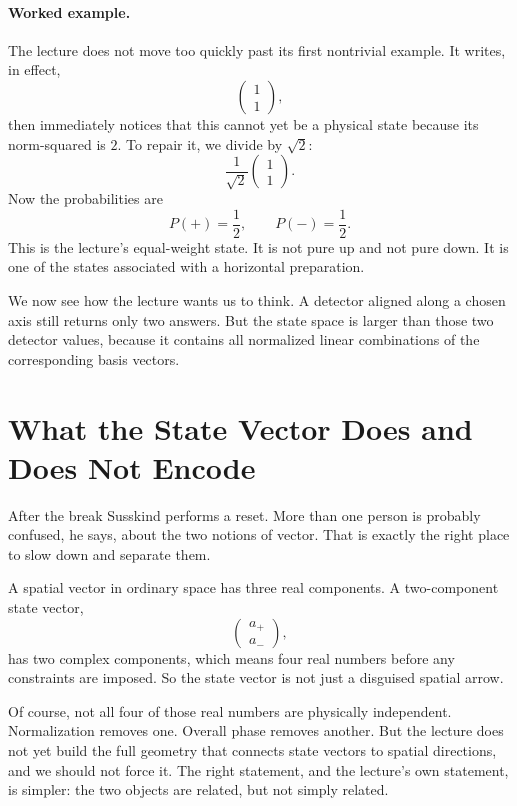 \paragraph{Worked example.}
The lecture does not move too quickly past its first nontrivial example. It writes, in effect,
\[
\begin{pmatrix}1\\1\end{pmatrix},
\]
then immediately notices that this cannot yet be a physical state because its norm-squared is \(2\). To repair it, we divide by \(\sqrt{2}\):
\begin{equation}
\frac{1}{\sqrt{2}}\begin{pmatrix}1\\1\end{pmatrix}.
\end{equation}
Now the probabilities are
\[
P(+)=\frac{1}{2},
\qquad
P(-)=\frac{1}{2}.
\]
This is the lecture's equal-weight state. It is not pure up and not pure down. It is one of the states associated with a horizontal preparation.

We now see how the lecture wants us to think. A detector aligned along a chosen axis still returns only two answers. But the state space is larger than those two detector values, because it contains all normalized linear combinations of the corresponding basis vectors.

\section{What the State Vector Does and Does Not Encode}

After the break Susskind performs a reset. More than one person is probably confused, he says, about the two notions of vector. That is exactly the right place to slow down and separate them.

A spatial vector in ordinary space has three real components. A two-component state vector,
\[
\begin{pmatrix}a_+\\a_-\end{pmatrix},
\]
has two complex components, which means four real numbers before any constraints are imposed. So the state vector is not just a disguised spatial arrow.

Of course, not all four of those real numbers are physically independent. Normalization removes one. Overall phase removes another. But the lecture does not yet build the full geometry that connects state vectors to spatial directions, and we should not force it. The right statement, and the lecture's own statement, is simpler: the two objects are related, but not simply related.

